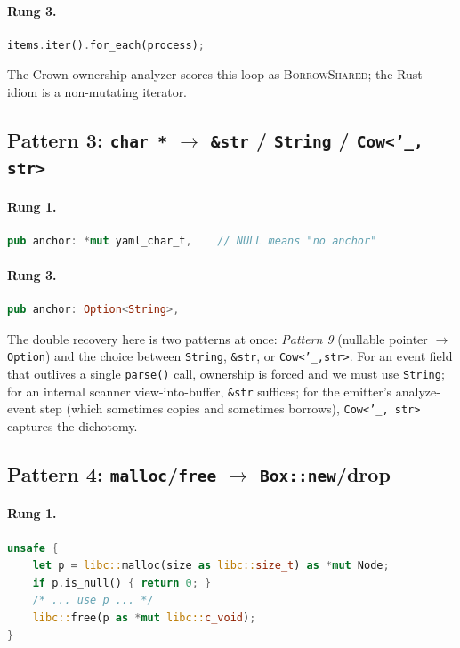 \documentclass[12pt]{article}
\theoremstyle{definition}
\theoremstyle{remark}
\begin{document}
\paragraph{Rung 3.}
\begin{lstlisting}[language=Rust]
items.iter().for_each(process);
\end{lstlisting}

The Crown ownership analyzer \cite{komaec2023crown} scores this loop as
\textsc{BorrowShared}; the Rust idiom is a non-mutating iterator.

\subsection{Pattern 3: \texttt{char *} $\to$ \texttt{\&str} / \texttt{String} / \texttt{Cow<'\_, str>}}

\paragraph{Rung 1.}
\begin{lstlisting}[language=Rust]
pub anchor: *mut yaml_char_t,    // NULL means "no anchor"
\end{lstlisting}

\paragraph{Rung 3.}
\begin{lstlisting}[language=Rust]
pub anchor: Option<String>,
\end{lstlisting}

The double recovery here is two patterns at once: \emph{Pattern 9}
(nullable pointer $\to$ \texttt{Option}) and the choice between
\texttt{String}, \texttt{\&str}, or \texttt{Cow<'\_,str>}. For an
event field that outlives a single \texttt{parse()} call, ownership is
forced and we must use \texttt{String}; for an internal scanner
view-into-buffer, \texttt{\&str} suffices; for the emitter's
analyze-event step (which sometimes copies and sometimes borrows),
\texttt{Cow<'\_, str>} captures the dichotomy.

\subsection{Pattern 4: \texttt{malloc}/\texttt{free} $\to$ \texttt{Box::new}/drop}

\paragraph{Rung 1.}
\begin{lstlisting}[language=Rust]
unsafe {
    let p = libc::malloc(size as libc::size_t) as *mut Node;
    if p.is_null() { return 0; }
    /* ... use p ... */
    libc::free(p as *mut libc::c_void);
}
\end{lstlisting}
\end{document}

